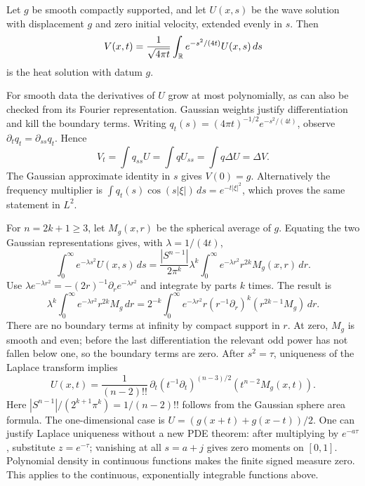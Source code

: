 \begin{theorem}
Let $g$ be smooth compactly supported, and let $U(x,s)$ be the wave
solution with displacement $g$ and zero initial velocity, extended evenly
in $s$. Then
\[
 V(x,t)=\frac1{\sqrt{4\pi t}}\int_{\mathbb{R}} e^{-s^2/(4t)}U(x,s)\,ds
\]
is the heat solution with datum $g$.
\end{theorem}
\begin{expandedproof}
For smooth data the derivatives of $U$ grow at most polynomially,
as can also be checked from its Fourier representation.
Gaussian weights justify differentiation and kill the boundary terms.
Writing $q_t(s)=(4\pi t)^{-1/2}e^{-s^2/(4t)}$, observe
$\partial_tq_t=\partial_{ss}q_t$. Hence
\[
 V_t=\int q_{ss}U=\int qU_{ss}=\int q\Delta U=\Delta V.
\]
The Gaussian approximate identity in $s$ gives $V(0)=g$.
Alternatively the frequency multiplier is
$\int q_t(s)\cos(s|\xi|)\,ds=e^{-t|\xi|^2}$,
which proves the same statement in $L^2$.
\end{expandedproof}

For $n=2k+1\geq3$, let $M_g(x,r)$ be the spherical average of $g$.
Equating the two Gaussian representations gives, with
$\lambda=1/(4t)$,
\[
 \int_0^\infty e^{-\lambda s^2}U(x,s)\,ds
 =\frac{|S^{n-1}|}{2\pi^k}\lambda^k
       \int_0^\infty e^{-\lambda r^2}r^{2k}M_g(x,r)\,dr .
\]
Use $\lambda e^{-\lambda r^2}=-(2r)^{-1}\partial_re^{-\lambda r^2}$
and integrate by parts $k$ times. The result is
\[
 \lambda^k\int_0^\infty e^{-\lambda r^2}r^{2k}M_g\,dr
 =2^{-k}\int_0^\infty e^{-\lambda r^2}
       r(r^{-1}\partial_r)^k(r^{2k-1}M_g)\,dr .
\]
There are no boundary terms at infinity by compact support in $r$.
At zero, $M_g$ is smooth and even; before the last differentiation
the relevant odd power has not fallen below one, so the boundary
terms are zero.
After $s^2=\tau$, uniqueness of the Laplace transform implies
\[
 U(x,t)=\frac1{(n-2)!!}\,
 \partial_t(t^{-1}\partial_t)^{(n-3)/2}
                  (t^{n-2}M_g(x,t)).
\]
Here $|S^{n-1}|/(2^{k+1}\pi^k)=1/(n-2)!!$ follows from the
Gaussian sphere area formula.
The one-dimensional case is $U=(g(x+t)+g(x-t))/2$.
One can justify Laplace uniqueness without a new PDE theorem:
after multiplying by $e^{-a\tau}$, substitute $z=e^{-\tau}$;
vanishing at all $s=a+j$ gives zero moments on $[0,1]$.
Polynomial density in continuous functions makes the finite signed
measure zero. This applies to the continuous, exponentially integrable
functions above.
